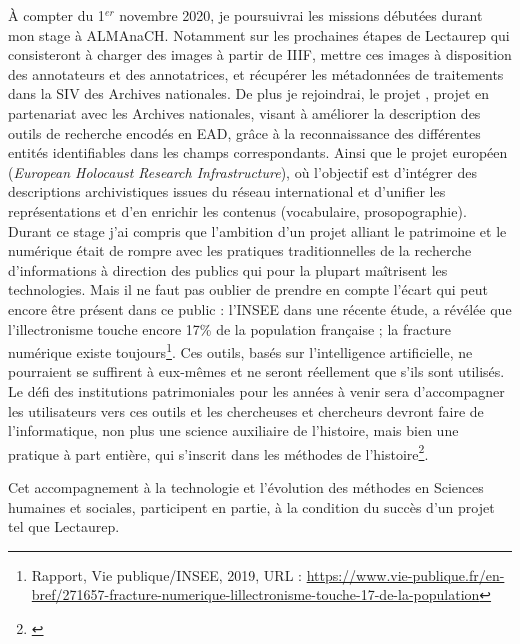 À compter du 1$^{er}$ novembre 2020, je poursuivrai les missions débutées durant mon stage à ALMAnaCH. Notamment sur les prochaines étapes de Lectaurep qui consisteront à charger des images à partir de IIIF, mettre ces images à disposition des annotateurs et des annotatrices, et récupérer les métadonnées de traitements dans la SIV des Archives nationales. De plus je rejoindrai, le projet , projet en partenariat avec les Archives nationales, visant à améliorer la description des outils de recherche encodés en EAD, grâce à la reconnaissance des différentes entités identifiables dans les champs correspondants. Ainsi que le projet européen  (\textit{European Holocaust Research Infrastructure}), où l'objectif est d'intégrer des descriptions archivistiques issues du réseau international et d'unifier les représentations et d'en enrichir les contenus (vocabulaire, prosopographie).\\

Durant ce stage j'ai compris que l'ambition d'un projet alliant le patrimoine et le numérique était de rompre avec les pratiques traditionnelles de la recherche d'informations à direction des publics qui pour la plupart maîtrisent les technologies. Mais il ne faut pas oublier de prendre en compte l'écart qui peut encore être présent dans ce public : l'INSEE dans une récente étude, a révélée que l'illectronisme touche encore 17\% de la population française ; la fracture numérique existe toujours\footnote{Rapport, Vie publique/INSEE, 2019, URL : \url{https://www.vie-publique.fr/en-bref/271657-fracture-numerique-lillectronisme-touche-17-de-la-population}}. Ces outils, basés sur l'intelligence artificielle, ne pourraient se suffirent à eux-mêmes et ne seront réellement  que s'ils sont utilisés. Le défi des institutions patrimoniales pour les années à venir sera d'accompagner les utilisateurs vers ces outils et les chercheuses et chercheurs devront faire de l'informatique, non plus une science auxiliaire de l'histoire, mais bien une pratique à part entière, qui s'inscrit dans les méthodes  de l'histoire\footnote{\cite{heimburger_faire_2011}}. 

Cet accompagnement à la technologie et l'évolution des méthodes en Sciences humaines et sociales, participent en partie, à la condition du succès d'un projet tel que Lectaurep.

\newpage
\thispagestyle{empty}